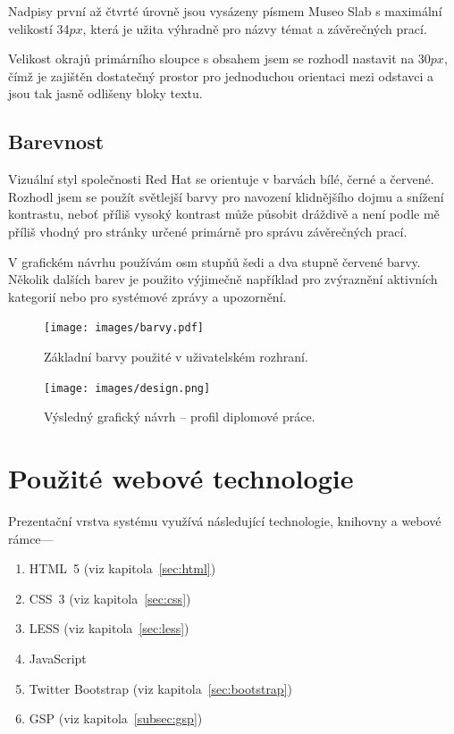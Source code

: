 Nadpisy první až čtvrté úrovně jsou vysázeny písmem Museo Slab s maximální velikostí 34$px$, která je užita výhradně pro názvy témat a závěrečných prací.

Velikost okrajů primárního sloupce s obsahem jsem se rozhodl nastavit na 30$px$, čímž je zajištěn dostatečný prostor pro jednoduchou orientaci mezi odstavci a jsou tak jasně odlišeny bloky textu.

\subsection{Barevnost}

Vizuální styl společnosti Red Hat se orientuje v barvách bílé, černé a červené. Rozhodl jsem se použít světlejší barvy pro navození klidnějšího dojmu a snížení kontrastu, neboť příliš vysoký kontrast může působit dráždivě a není podle mě příliš vhodný pro stránky určené primárně pro správu závěrečných prací.

V grafickém návrhu používám osm stupňů šedi a dva stupně červené barvy. Několik dalších barev je použito výjimečně například pro zvýraznění aktivních kategorií nebo pro systémové zprávy a upozornění.

\begin{figure}[htbp]
    \centering
    \texttt{[image: images/barvy.pdf]}
    \caption{Základní barvy použité v uživatelském rozhraní.}
    \label{img:colors}
\end{figure}

\begin{figure}[htbp]
    \centering
    \texttt{[image: images/design.png]}
    \caption{Výsledný grafický návrh -- profil diplomové práce.}
    \label{img:design}
\end{figure}

\section{Použité webové technologie}

Prezentační vrstva systému využívá následující technologie, knihovny a webové rámce---

\begin{enumerate}
    \item HTML~5 (viz kapitola~\ref{sec:html})
    \item CSS~3 (viz kapitola~\ref{sec:css})
    \item LESS (viz kapitola~\ref{sec:less})
    \item JavaScript\footnotemark[1]
    \item Twitter Bootstrap (viz kapitola~\ref{sec:bootstrap})
    \item GSP (viz kapitola~\ref{subsec:gsp})
\end{enumerate}

